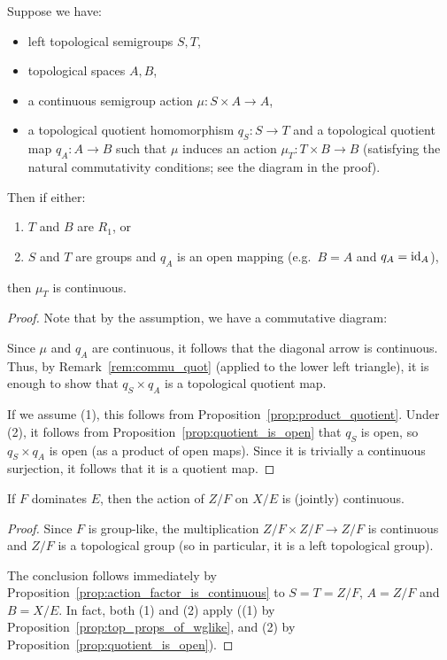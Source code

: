 	\begin{prop}
		\label{prop:action_factor_is_continuous}
		Suppose we have:
		\begin{itemize}
			\item
			left topological semigroups $S,T$,
			\item
			topological spaces $A,B$,
			\item
			a continuous semigroup action $\mu\colon S\times A\to A$,
			\item
			a topological quotient homomorphism $q_S\colon S\to T$ and a topological quotient map $q_A\colon A\to B$ such that $\mu$ induces an action $\mu_T\colon T\times B\to B$ (satisfying the natural commutativity conditions; see the diagram in the proof).
		\end{itemize}
		Then if either:
		\begin{enumerate}
			\item
			$T$ and $B$ are $R_1$, or
			\item
			$S$ and $T$ are groups and $q_A$ is an open mapping (e.g.\ $B=A$ and $q_A=\operatorname{{id}}_A$),
		\end{enumerate}
		then $\mu_T$ is continuous.
	\end{prop}
	\begin{proof}
		Note that by the assumption, we have a commutative diagram:
		\begin{center}
		\end{center}
		Since $\mu$ and $q_A$ are continuous, it follows that the diagonal arrow is continuous. Thus, by Remark~\ref{rem:commu_quot} (applied to the lower left triangle), it is enough to show that $q_S\times q_A$ is a topological quotient map.
		
		If we assume (1), this follows from Proposition~\ref{prop:product_quotient}. Under (2), it follows from Proposition~\ref{prop:quotient_is_open} that $q_S$ is open, so $q_S\times q_A$ is open (as a product of open maps). Since it is trivially a continuous surjection, it follows that it is a quotient map.
	\end{proof}
	
	
	\begin{prop}
		\label{prop:grouplike_cont_action}
		If $F$ dominates $E$, then the action of $Z/F$ on $X/E$ is (jointly) continuous.
	\end{prop}
	\begin{proof}
		Since $F$ is group-like, the multiplication $Z/F\times Z/F\to Z/F$ is continuous and $Z/F$ is a topological group (so in particular, it is a left topological group).
		
		The conclusion follows immediately by Proposition~\ref{prop:action_factor_is_continuous} to $S=T=Z/F$, $A=Z/F$ and $B=X/E$. In fact, both (1) and (2) apply ((1) by Proposition~\ref{prop:top_props_of_wglike}, and (2) by Proposition~\ref{prop:quotient_is_open}).
	\end{proof}
	

